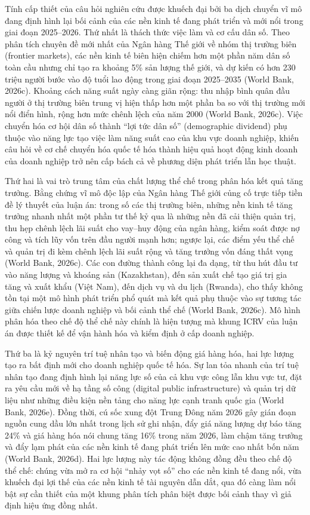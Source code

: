 \documentclass[
  a4paper,
  13pt]{extreport}
\begin{document}
Tính cấp thiết của câu hỏi nghiên cứu được khuếch đại bởi ba dịch chuyển
vĩ mô đang định hình lại bối cảnh của các nền kinh tế đang phát triển và
mới nổi trong giai đoạn 2025--2026. Thứ nhất là thách thức việc làm và
cơ cấu dân số. Theo phân tích chuyên đề mới nhất của Ngân hàng Thế giới
về nhóm thị trường biên (frontier markets), các nền kinh tế biên hiện
chiếm hơn một phần năm dân số toàn cầu nhưng chỉ tạo ra khoảng 5\% sản
lượng thế giới, và dự kiến có hơn 230 triệu người bước vào độ tuổi lao
động trong giai đoạn 2025--2035 (World Bank, 2026c). Khoảng cách năng
suất ngày càng giãn rộng: thu nhập bình quân đầu người ở thị trường biên
trung vị hiện thấp hơn một phần ba so với thị trường mới nổi điển hình,
rộng hơn mức chênh lệch của năm 2000 (World Bank, 2026c). Việc chuyển
hóa cơ hội dân số thành ``lợi tức dân số'' (demographic dividend) phụ
thuộc vào năng lực tạo việc làm năng suất cao của khu vực doanh nghiệp,
khiến câu hỏi về cơ chế chuyển hóa quốc tế hóa thành hiệu quả hoạt động
kinh doanh của doanh nghiệp trở nên cấp bách cả về phương diện phát
triển lẫn học thuật.

Thứ hai là vai trò trung tâm của chất lượng thể chế trong phân hóa kết
quả tăng trưởng. Bằng chứng vĩ mô độc lập của Ngân hàng Thế giới củng cố
trực tiếp tiền đề lý thuyết của luận án: trong số các thị trường biên,
những nền kinh tế tăng trưởng nhanh nhất một phần tư thế kỷ qua là những
nền đã cải thiện quản trị, thu hẹp chênh lệch lãi suất cho vay--huy động
của ngân hàng, kiểm soát được nợ công và tích lũy vốn trên đầu người
mạnh hơn; ngược lại, các điểm yếu thể chế và quản trị đi kèm chênh lệch
lãi suất rộng và tăng trưởng vốn đáng thất vọng (World Bank, 2026c). Các
con đường thành công lại đa dạng, từ thu hút đầu tư vào năng lượng và
khoáng sản (Kazakhstan), đến sản xuất chế tạo giá trị gia tăng và xuất
khẩu (Việt Nam), đến dịch vụ và du lịch (Rwanda), cho thấy không tồn tại
một mô hình phát triển phổ quát mà kết quả phụ thuộc vào sự tương tác
giữa chiến lược doanh nghiệp và bối cảnh thể chế (World Bank, 2026c). Mô
hình phân hóa theo chế độ thể chế này chính là hiện tượng mà khung ICRV
của luận án được thiết kế để vận hành hóa và kiểm định ở cấp doanh
nghiệp.

Thứ ba là kỷ nguyên trí tuệ nhân tạo và biến động giá hàng hóa, hai lực
lượng tạo ra bất định mới cho doanh nghiệp quốc tế hóa. Sự lan tỏa nhanh
của trí tuệ nhân tạo đang định hình lại năng lực số của cả khu vực công
lẫn khu vực tư, đặt ra yêu cầu mới về hạ tầng số công (digital public
infrastructure) và quản trị dữ liệu như những điều kiện nền tảng cho
năng lực cạnh tranh quốc gia (World Bank, 2026e). Đồng thời, cú sốc xung
đột Trung Đông năm 2026 gây gián đoạn nguồn cung dầu lớn nhất trong lịch
sử ghi nhận, đẩy giá năng lượng dự báo tăng 24\% và giá hàng hóa nói
chung tăng 16\% trong năm 2026, làm chậm tăng trưởng và đẩy lạm phát của
các nền kinh tế đang phát triển lên mức cao nhất bốn năm (World Bank,
2026d). Hai lực lượng này tác động không đồng đều theo chế độ thể chế:
chúng vừa mở ra cơ hội ``nhảy vọt số'' cho các nền kinh tế đang nổi, vừa
khuếch đại lợi thế của các nền kinh tế tài nguyên dẫn dắt, qua đó càng
làm nổi bật sự cần thiết của một khung phân tích phân biệt được bối cảnh
thay vì giả định hiệu ứng đồng nhất.
\end{document}
